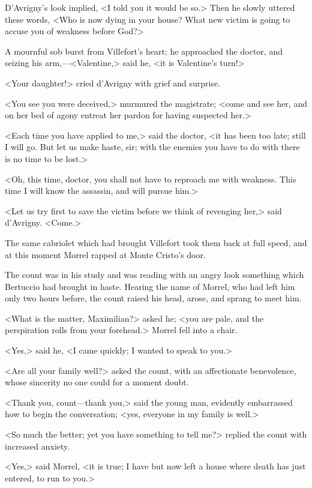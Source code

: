  D'Avrigny's look implied, <I told you it would be so.> Then he slowly uttered these words, <Who is now dying in your house? What new victim is going to accuse you of weakness before God?> 

 A mournful sob burst from Villefort's heart; he approached the doctor, and seizing his arm,—<Valentine,> said he, <it is Valentine's turn!>

<Your daughter!> cried d'Avrigny with grief and surprise. 

 <You see you were deceived,> murmured the magistrate; <come and see her, and on her bed of agony entreat her pardon for having suspected her.> 

 <Each time you have applied to me,> said the doctor, <it has been too late; still I will go. But let us make haste, sir; with the enemies you have to do with there is no time to be lost.> 

 <Oh, this time, doctor, you shall not have to reproach me with weakness. This time I will know the assassin, and will pursue him.> 

 <Let us try first to save the victim before we think of revenging her,> said d'Avrigny. <Come.> 

 The same cabriolet which had brought Villefort took them back at full speed, and at this moment Morrel rapped at Monte Cristo's door. 

 The count was in his study and was reading with an angry look something which Bertuccio had brought in haste. Hearing the name of Morrel, who had left him only two hours before, the count raised his head, arose, and sprang to meet him. 

 <What is the matter, Maximilian?> asked he; <you are pale, and the perspiration rolls from your forehead.> Morrel fell into a chair. 

 <Yes,> said he, <I came quickly; I wanted to speak to you.> 

 <Are all your family well?> asked the count, with an affectionate benevolence, whose sincerity no one could for a moment doubt. 

 <Thank you, count—thank you,> said the young man, evidently embarrassed how to begin the conversation; <yes, everyone in my family is well.> 

 <So much the better; yet you have something to tell me?> replied the count with increased anxiety. 

 <Yes,> said Morrel, <it is true; I have but now left a house where death has just entered, to run to you.> 

